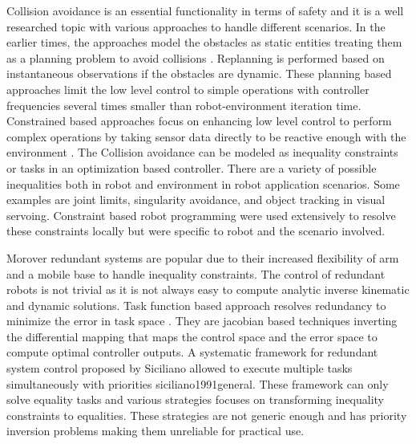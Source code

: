 
Collision avoidance is an essential functionality in terms of safety and it is a well researched topic with various approaches  to handle different scenarios. In the earlier times, the approaches model the obstacles as static entities treating them as a planning problem to avoid collisions \cite{van2011reciprocal}. Replanning is performed based on instantaneous observations if the obstacles are dynamic. These planning based approaches limit the low level control to simple operations with controller frequencies  several times smaller than robot-environment iteration time. Constrained based approaches focus on enhancing low level control to perform complex operations by taking sensor data directly to be reactive enough with the environment \cite{khatib1986real}. The Collision avoidance can be modeled as inequality constraints or tasks in an optimization based controller. There are a variety of possible inequalities both in robot and environment in robot application scenarios. Some examples are joint limits, singularity avoidance, and object tracking in visual servoing. Constraint based robot programming were used extensively to resolve these constraints  locally but were specific to robot and the scenario involved.

Morover  redundant systems are popular due to their increased flexibility of arm and a mobile base to handle inequality constraints. The control of redundant robots is not trivial as it is not always easy to compute  analytic inverse kinematic and dynamic solutions. Task function based approach  resolves redundancy to minimize the error in task space \cite{Samson1991}. They are jacobian based techniques inverting the differential mapping that maps the control space and the error space to compute optimal controller outputs. A systematic framework for redundant system control proposed by Siciliano allowed to execute multiple tasks simultaneously with priorities {siciliano1991general}. These framework can only solve equality tasks and various strategies focuses on transforming inequality constraints to equalities\cite{Nelson95strategiesfor,chan1995weighted,mansard2009directional,raunhardt2007progressive}. These strategies are not generic enough and has priority inversion problems making them unreliable for practical use. 

